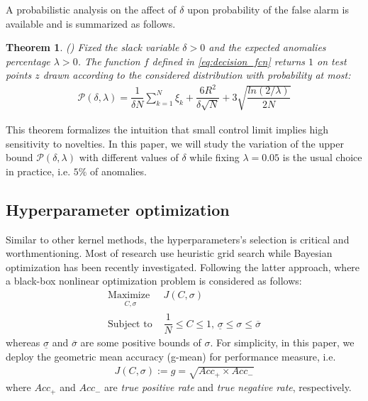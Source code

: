 \documentclass[3p]{elsarticle}
\theoremstyle{problemstyle}
\newtheorem{Theorem}{Theorem}
\begin{document}
A probabilistic analysis on the affect of $\delta$ upon probability of the false alarm is available and is summarized as follows.
\begin{Theorem}{(\cite[Theorem~7.9]{shawe2004kernel})}
Fixed the slack variable $\delta > 0$ and the expected anomalies percentage $\lambda > 0$. The function $f$ defined in \eqref{eq:decision_fcn} returns $1$ on test points $z$ drawn according to the considered distribution with probability at most:
\begin{align}
\mathcal{P} \left( \delta, \lambda \right) = \dfrac{1}{\delta N} \sum_{k=1}^N \xi_k + \dfrac{6R^2}{\delta \sqrt{N}} + 3 \sqrt{\dfrac{ln \left( 2 {}/ \lambda \right)}{2N}}
\end{align}
\end{Theorem}
This theorem formalizes the intuition that small control limit implies high sensitivity to novelties. In this paper, we will study the variation of the upper bound $\mathcal{P} \left( \delta, \lambda \right)$ with different values of $\delta$ while fixing $\lambda=0.05$ is the usual choice in practice, i.e. $5 \%$ of anomalies. 

\subsection{Hyperparameter optimization}

Similar to other kernel methods, the hyperparameters's selection is critical and worthmentioning. Most of research use heuristic grid search while Bayesian optimization has been recently investigated. Following the latter approach, where a black-box nonlinear optimization problem is considered as follows:
\begin{subequations}\label{eq:param_opt}
\begin{align}
\underset{
	\begin{array}{c}
		 C, \sigma
	\end{array}}{\text{Maximize }} &J \left( C, \sigma \right) \\
\text{Subject to } & \dfrac{1}{N} \le C \le 1 \text{, } \underline{\sigma} \le \sigma \le \overline{\sigma}
\end{align}
\end{subequations}
whereas $\underline{\sigma}$ and $\overline{\sigma}$ are some positive bounds of $\sigma$. For simplicity, in this paper, we deploy the geometric mean accuracy (g-mean) for performance measure, i.e.
\begin{align}\label{eq:gmean}
J \left( C, \sigma \right) := g = \sqrt{Acc_+ \times Acc_-}
\end{align}
where $Acc_+$ and $Acc_-$ are \emph{true positive rate} and \emph{true negative rate}, respectively.
\end{document}
